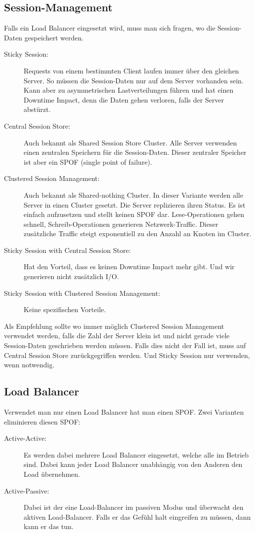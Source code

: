 \subsection{Session-Management}
Falls ein Load Balancer eingesetzt wird, muss man sich fragen, wo die Session-Daten gespeichert werden.
\begin{description}
	\item[Sticky Session:] Requests von einem bestimmten Client laufen immer über den gleichen Server. So müssen die Session-Daten nur auf dem Server vorhanden sein. Kann aber zu asymmetrischen Lastverteilungen führen und hat einen Downtime Impact, denn die Daten gehen verloren, falls der Server abstürzt.
	\item[Central Session Store:] Auch bekannt als Shared Session Store Cluster. Alle Server verwenden einen zentralen Speichern für die Session-Daten. Dieser zentraler Speicher ist aber ein SPOF (single point of failure).
	\item[Clustered Session Management:] Auch bekannt als Shared-nothing Cluster. In dieser Variante werden alle Server in einen Cluster gesetzt. Die Server replizieren ihren Status. Es ist einfach aufzusetzen und stellt keinen SPOF dar. Lese-Operationen gehen schnell, Schreib-Operationen generieren Netzwerk-Traffic. Dieser zusätzliche Traffic steigt exponentiell zu den Anzahl an Knoten im Cluster.
	\item[Sticky Session with Central Session Store:] Hat den Vorteil, dass es keinen Downtime Impact mehr gibt. Und wir generieren nicht zusätzlich I/O.
	\item[Sticky Session with Clustered Session Management:] Keine spezifischen Vorteile.
\end{description}
Als Empfehlung sollte wo immer möglich Clustered Session Management verwendet werden, falls die Zahl der Server klein ist und nicht gerade viele Session-Daten geschrieben werden müssen. Falls dies nicht der Fall ist, muss auf Central Session Store zurückgegriffen werden. Und Sticky Session nur verwenden, wenn notwendig.

\subsection{Load Balancer}
Verwendet man nur einen Load Balancer hat man einen SPOF. Zwei Varianten eliminieren diesen SPOF:
\begin{description}
	\item[Active-Active:] Es werden dabei mehrere Load Balancer eingesetzt, welche alle im Betrieb sind. Dabei kann jeder Load Balancer unabhängig von den Anderen den Load übernehmen.
	\item[Active-Passive:] Dabei ist der eine Load-Balancer im passiven Modus und überwacht den aktiven Load-Balancer. Falls er das Gefühl halt eingreifen zu müssen, dann kann er das tun.
\end{description}

